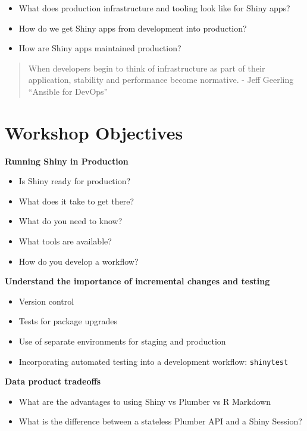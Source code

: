 \documentclass[]{book}
\providecommand{\tightlist}{%
  \setlength{\itemsep}{0pt}\setlength{\parskip}{0pt}}
\theoremstyle{definition}
\theoremstyle{definition}
\theoremstyle{definition}
\theoremstyle{remark}
\begin{document}
\begin{itemize}
\tightlist
\item
  What does production infrastructure and tooling look like for Shiny
  apps?
\item
  How do we get Shiny apps from development into production?
\item
  How are Shiny apps maintained production?
\end{itemize}

\begin{quote}
When developers begin to think of infrastructure as part of their
application, stability and performance become normative. - Jeff Geerling
``Ansible for DevOps''
\end{quote}

\hypertarget{workshop-objectives}{%
\section{Workshop Objectives}\label{workshop-objectives}}

\textbf{Running Shiny in Production}

\begin{itemize}
\tightlist
\item
  Is Shiny ready for production?
\item
  What does it take to get there?
\item
  What do you need to know?
\item
  What tools are available?
\item
  How do you develop a workflow?
\end{itemize}

\textbf{Understand the importance of incremental changes and testing}

\begin{itemize}
\tightlist
\item
  Version control
\item
  Tests for package upgrades
\item
  Use of separate environments for staging and production
\item
  Incorporating automated testing into a development workflow:
  \texttt{shinytest}
\end{itemize}

\textbf{Data product tradeoffs}

\begin{itemize}
\tightlist
\item
  What are the advantages to using Shiny vs Plumber vs R Markdown
\item
  What is the difference between a stateless Plumber API and a Shiny
  Session?
\end{itemize}
\end{document}
